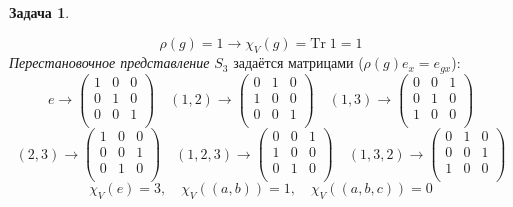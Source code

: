 \documentclass[12pt]{article}
\theoremstyle{definition}
\newtheorem{zad}{Задача}[section]
\begin{document}
\begin{zad}
\begin{itemize}
    \begin{equation}
        \rho(g)=1\rightarrow \boxed{\chi_V(g)=\text{Tr}\;1=1}
    \end{equation}
    \textit{Перестановочное представление} $S_3$ задаётся матрицами ($\rho(g)e_x=e_{gx}$):
    \begin{equation}
        e\rightarrow
        \left(
    \begin{array}{ccc}
    1 & 0 & 0\\
    0 & 1 & 0\\
    0 & 0 & 1\\
    \end{array}
    \right)\quad (1,2)\rightarrow
        \left(
    \begin{array}{ccc}
    0 & 1 & 0\\
    1 & 0 & 0\\
    0 & 0 & 1\\
    \end{array}
    \right)\quad (1,3)\rightarrow
        \left(
    \begin{array}{ccc}
    0 & 0 & 1\\
    0 & 1 & 0\\
    1 & 0 & 0\\
    \end{array}
    \right)
    \end{equation}
    \begin{equation}
        (2,3)\rightarrow
        \left(
    \begin{array}{ccc}
    1 & 0 & 0\\
    0 & 0 & 1\\
    0 & 1 & 0\\
    \end{array}
    \right)\quad (1,2,3)\rightarrow
        \left(
    \begin{array}{ccc}
    0 & 0 & 1\\
    1 & 0 & 0\\
    0 & 1 & 0\\
    \end{array}
    \right)\quad (1,3,2)\rightarrow
        \left(
    \begin{array}{ccc}
    0 & 1 & 0\\
    0 & 0 & 1\\
    1 & 0 & 0\\
    \end{array}
    \right)
    \end{equation}
    \begin{equation}
        \boxed{\chi_V(e)=3,\quad\chi_V((a,b))=1,\quad\chi_V((a,b,c))=0}

\end{equation}
\end{itemize}
\end{zad}
\end{document}
